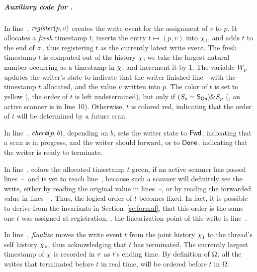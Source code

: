 

\subparagraph*{Auxiliary code for \jywrite.}
%
In line~\lineWrtWrt, $\textit{register}(p, v)$ creates the write event
for the assignment of $v$ to $p$. It allocates a \emph{fresh}
timestamp $t$, inserts the entry $t \mapsto (p, v)$ into $\chi_{\, \mathsf{j}}$, and
adds $t$ to the end of $\sigma$, thus registering $t$ as the
currently latest write event. The fresh timestamp $t$ is computed out
of the history $\chi$; we take the largest natural number occurring
as a timestamp in $\chi$, and increment it by $1$.  The variable
$W_p$ updates the writer's state to indicate that the writer finished
line~\lineWrtWrt\ with the timestamp $t$ allocated, and the value $v$
written into $p$. The color of $t$ is set to yellow (\ie, the order of
$t$ is left undetermined), but only if $(S_s= \mathsf{S_{On}}) \& S_p$ (\ie, an
active scanner is in line 10). Otherwise, $t$ is colored red,
indicating that the order of $t$ will be determined by a future scan.

In line~\lineWrtChk, $\textit{check}(p,b)$, depending on $b$, sets the
writer state to $\mathsf{Fwd}$, indicating that a scan is in progress, and
the writer should forward, or to $\mathsf{Done}$, indicating that the writer
is ready to terminate.

In line~\lineWrtFwd,  colors the allocated timestamp $t$
green, if an active scanner has passed
lines~\lineScanClearsX--\lineScanClearsY~and is yet to reach
line~\lineScanUnsetsS, because such a scanner will definitely see the
write, either by reading the original value in
lines~\lineScanReadsX--\lineScanReadsY, or by reading the forwarded
value in lines~\lineScanReadsFX--\lineScanReadsFY. Thus, the logical
order of $t$ becomes fixed. In fact, it is possible to derive from the
invariants in Section~\ref{sc:formal}, that this order is the same one
$t$ was assigned at registration, \ie, the linearization point of
this write is line~\lineWrtWrt.

In line~\lineWrtFnz, $\textit{finalize}$ moves the write event $t$ from
the joint history $\chi_{\, \mathsf{j}}$ to the thread's self history $\chi_{\, \mathsf{s}}$, thus
acknowledging that $t$ has terminated. The currently largest timestamp
of $\chi$ is recorded in $\tau$ as $t$'s ending time. By definition of
$\Omega$, all the writes that terminated before $t$ in real
time, will be ordered before $t$ in $\Omega$.

